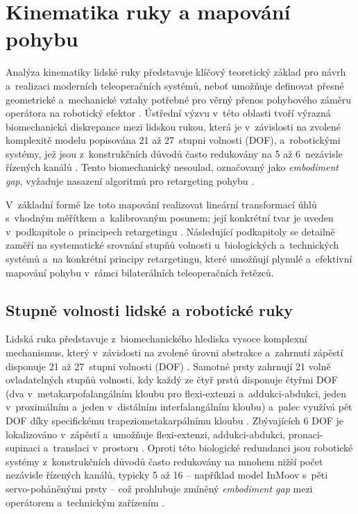 \documentclass[FZS,DP]{tulthesis}
\begin{document}
\section{Kinematika ruky a mapování pohybu}
Analýza kinematiky lidské ruky představuje klíčový teoretický základ pro návrh a~realizaci moderních teleoperačních systémů, neboť umožňuje definovat přesné geometrické a~mechanické vztahy potřebné pro věrný přenos pohybového záměru operátora na robotický efektor \cite{Belcamino2024, GIUDICI2025, Mizrahi2023}.
Ústřední výzvu v~této oblasti tvoří výrazná biomechanická diskrepance mezi lidskou rukou, která je v~závislosti na zvolené komplexitě modelu popisována 21 až 27~stupni volnosti (DOF), a~robotickými systémy, jež jsou z~konstrukčních důvodů často redukovány na 5 až 6~nezávisle řízených kanálů \cite{Belcamino2024, Devaraja20201222, Zhang2025}.
Tento biomechanický nesoulad, označovaný jako \textit{embodiment gap}, vyžaduje nasazení algoritmů pro retargeting pohybu \cite{Zhang2025}.

V~základní formě lze toto mapování realizovat lineární transformací úhlů s~vhodným měřítkem a~kalibrovaným posunem; její konkrétní tvar je uveden v~podkapitole o~principech retargetingu \cite{Zhang2025, Mizrahi2023}.
Následující podkapitoly se detailně zaměří na systematické srovnání stupňů volnosti u~biologických a~technických systémů a~na konkrétní principy retargetingu, které umožňují plynulé a~efektivní mapování pohybu v~rámci bilaterálních teleoperačních řetězců.

\subsection{Stupně volnosti lidské a robotické ruky}
Lidská ruka představuje z~biomechanického hlediska vysoce komplexní mechanismus, který v~závislosti na zvolené úrovni abstrakce a~zahrnutí zápěstí disponuje 21 až 27~stupni volnosti (DOF) \cite{Belcamino2024, Devaraja20201222, GIUDICI2025}.
Samotné prsty zahrnují 21 volně ovladatelných stupňů volnosti, kdy každý ze čtyř prstů disponuje čtyřmi DOF (dva v~metakarpofalangálním kloubu pro flexi-extenzi a~addukci-abdukci, jeden v~proximálním a~jeden v~distálním interfalangálním kloubu) a~palec využívá pět DOF díky specifickému trapeziometakarpálnímu kloubu \cite{Belcamino2024, Capek2018, Cihak2011}.
Zbývajících 6 DOF je lokalizováno v~zápěstí a~umožňuje flexi-extenzi, addukci-abdukci, pronaci-supinaci a~translaci v~prostoru \cite{Belcamino2024}.
Oproti této biologické redundanci jsou robotické systémy z~konstrukčních důvodů často redukovány na mnohem nižší počet nezávisle řízených kanálů, typicky 5 až 16 -- například model InMoov s~pěti servo-poháněnými prsty -- což prohlubuje zmíněný \textit{embodiment gap} mezi operátorem a~technickým zařízením \cite{Devaraja20201222, GIUDICI2025, Zhang2025}.
\end{document}

